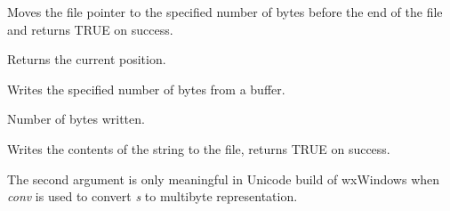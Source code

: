 
Moves the file pointer to the specified number of bytes before the end of the file
and returns TRUE on success.



\label{wxffiletell}


Returns the current position.

\label{wxffilewrite}


Writes the specified number of bytes from a buffer.





Number of bytes written.

\label{wxffilewrites}


Writes the contents of the string to the file, returns TRUE on success.

The second argument is only meaningful in Unicode build of wxWindows when
{\it conv} is used to convert {\it s} to multibyte representation.



